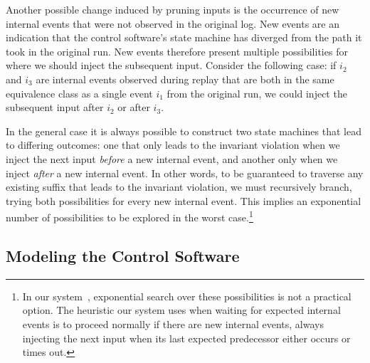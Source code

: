 Another possible change induced by pruning inputs is the occurrence of new
internal events that were not observed in the original log.
New events are an indication that the control software's state machine has
diverged from the path it took in the original run. New events therefore present multiple
possibilities for where
we should inject the subsequent input. Consider the following case:
if $i_2$ and $i_3$ are internal events observed
during replay that are both in the same equivalence class as a single event $i_1$ from the
original run, we could inject the subsequent input after $i_2$ or after $i_3$.



In the general case it is always possible to construct two state machines that lead
to differing outcomes: one that only leads to the invariant violation when
we inject the next input
\emph{before} a new internal event, and another only when we inject \emph{after} a new internal
event. In other words, to be guaranteed to traverse any existing suffix that leads
to the invariant violation, we must recursively branch, trying both
possibilities for every new internal event. This implies an exponential number of
possibilities to be explored in the worst case.\footnote{
In our system~\cite{sts}, exponential search over these possibilities is not a practical option.
The heuristic our system uses when waiting for expected internal
events is to proceed normally if there are new internal events,
always injecting the next input when its last expected predecessor
either occurs or times out.}

\subsection{Modeling the Control Software}

